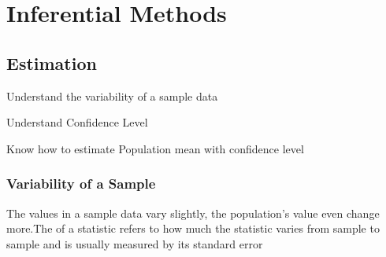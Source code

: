 \section{Inferential Methods}

\subsection{Estimation}
\begin{objectives}
    \item Understand the variability of a sample data
    \item Understand Confidence Level
    \item Know how to estimate Population mean with confidence level
\end{objectives}

\subsubsection{Variability of a Sample}
The values in a sample data vary slightly, the population's value even change more.The  of a statistic refers to how much the statistic varies from sample to sample and is usually measured by its standard error
